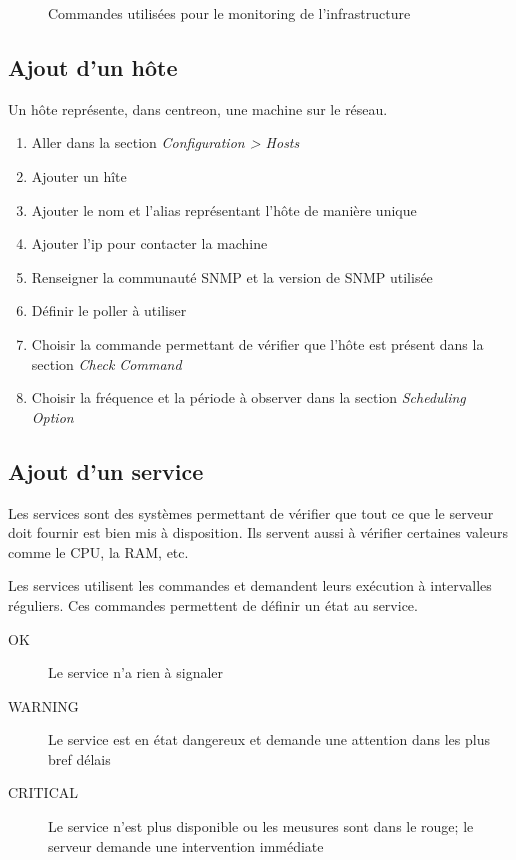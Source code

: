 \begin{figure}
\begin{tabulary}{\textwidth}{|C|L|}
			\end{tabulary}
			\caption{Commandes utilisées pour le monitoring de l'infrastructure}
		\end{figure}

		\clearpage

		\subsection{Ajout d'un hôte}

		Un hôte représente, dans centreon, une machine sur le réseau.

		\begin{enumerate}
			\item Aller dans la section \emph{Configuration > Hosts}
			\item Ajouter un hîte
			\item Ajouter le nom et l'alias représentant l'hôte de manière unique
			\item Ajouter l'ip pour contacter la machine
			\item Renseigner la communauté SNMP et la version de SNMP utilisée
			\item Définir le poller à utiliser
			\item Choisir la commande permettant de vérifier que l'hôte est présent dans la section \emph{Check Command}
			\item Choisir la fréquence et la période à observer dans la section \emph{Scheduling Option}
		\end{enumerate}

		\subsection{Ajout d'un service}

		Les services sont des systèmes permettant de vérifier que tout ce que le serveur doit fournir est bien mis à disposition.
		Ils servent aussi à vérifier certaines valeurs comme le CPU, la RAM, etc.

		Les services utilisent les commandes et demandent leurs exécution à intervalles réguliers.
		Ces commandes permettent de définir un état au service.

		\begin{description}
			\item[OK] Le service n'a rien à signaler
			\item[WARNING] Le service est en état dangereux et demande une attention dans les plus bref délais
			\item[CRITICAL] Le service n'est plus disponible ou les meusures sont dans le rouge; le serveur demande une intervention immédiate
		\end{description}

